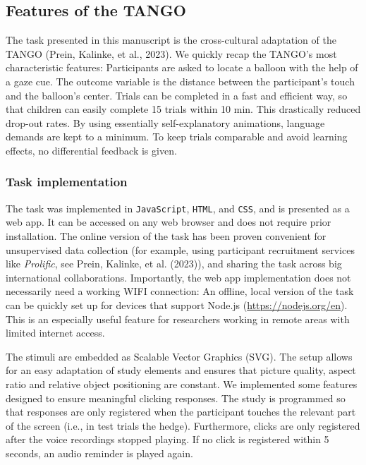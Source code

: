 \documentclass[
  man,mask,floatsintext]{apa7}
\begin{document}
\hypertarget{features-of-the-tango}{%
\subsection{Features of the TANGO}\label{features-of-the-tango}}

The task presented in this manuscript is the cross-cultural adaptation of the TANGO (Prein, Kalinke, et al., 2023). We quickly recap the TANGO's most characteristic features: Participants are asked to locate a balloon with the help of a gaze cue. The outcome variable is the distance between the participant's touch and the balloon's center. Trials can be completed in a fast and efficient way, so that children can easily complete 15 trials within 10 min. This drastically reduced drop-out rates. By using essentially self-explanatory animations, language demands are kept to a minimum. To keep trials comparable and avoid learning effects, no differential feedback is given.

\hypertarget{task-implementation}{%
\subsubsection{Task implementation}\label{task-implementation}}

The task was implemented in \texttt{JavaScript}, \texttt{HTML}, and \texttt{CSS}, and is presented as a web app. It can be accessed on any web browser and does not require prior installation. The online version of the task has been proven convenient for unsupervised data collection (for example, using participant recruitment services like \emph{Prolific}, see Prein, Kalinke, et al. (2023)), and sharing the task across big international collaborations. Importantly, the web app implementation does not necessarily need a working WIFI connection: An offline, local version of the task can be quickly set up for devices that support Node.js (\url{https://nodejs.org/en}). This is an especially useful feature for researchers working in remote areas with limited internet access.

The stimuli are embedded as Scalable Vector Graphics (SVG). The setup allows for an easy adaptation of study elements and ensures that picture quality, aspect ratio and relative object positioning are constant. We implemented some features designed to ensure meaningful clicking responses. The study is programmed so that responses are only registered when the participant touches the relevant part of the screen (i.e., in test trials the hedge). Furthermore, clicks are only registered after the voice recordings stopped playing. If no click is registered within 5 seconds, an audio reminder is played again.
\end{document}
